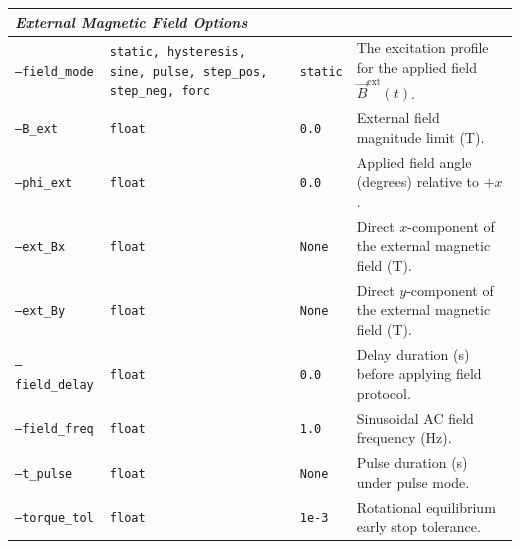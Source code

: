 \documentclass[11pt,a4paper]{article}
\newcommand{\code}[1]{\texttt{#1}}
\begin{document}
\begin{longtable}{lp{3.5cm}lp{6.0cm}}
\multicolumn{4}{l}{\textit{External Magnetic Field Options}} \\
\midrule
\code{--field\_mode} & \code{static, hysteresis, sine, pulse, step\_pos, step\_neg, forc} & \code{static} & The excitation profile for the applied field $\vec{B}^{\text{ext}}(t)$. \\
\code{--B\_ext} & \code{float} & \code{0.0} & External field magnitude limit (\si{T}). \\
\code{--phi\_ext} & \code{float} & \code{0.0} & Applied field angle (degrees) relative to $+x$. \\
\code{--ext\_Bx} & \code{float} & \code{None} & Direct $x$-component of the external magnetic field (\si{T}). \\
\code{--ext\_By} & \code{float} & \code{None} & Direct $y$-component of the external magnetic field (\si{T}). \\
\code{--field\_delay} & \code{float} & \code{0.0} & Delay duration (\si{s}) before applying field protocol. \\
\code{--field\_freq} & \code{float} & \code{1.0} & Sinusoidal AC field frequency (\si{Hz}). \\
\code{--t\_pulse} & \code{float} & \code{None} & Pulse duration (\si{s}) under pulse mode. \\
\code{--torque\_tol} & \code{float} & \code{1e-3} & Rotational equilibrium early stop tolerance. \\
\midrule


\end{longtable}
\end{document}
